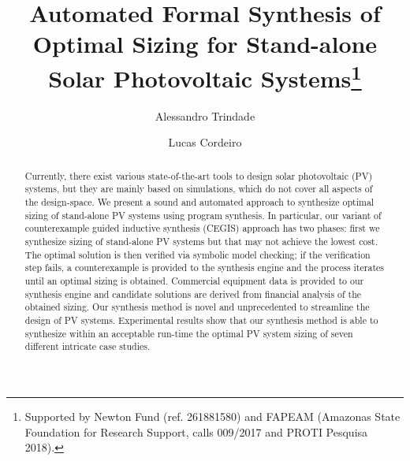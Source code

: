 \documentclass[runningheads]{llncs}
\begin{document}
%
\title{Automated Formal Synthesis of Optimal Sizing for Stand-alone Solar Photovoltaic Systems\thanks{Supported by Newton Fund (ref. 261881580) and FAPEAM
(Amazonas State Foundation for Research Support, calls 009/2017 and PROTI Pesquisa 2018).}}
%
%
\author{Alessandro Trindade \and
Lucas Cordeiro}
%
%
\maketitle              %

\begin{abstract}
Currently, there exist various state-of-the-art tools to design solar photovoltaic (PV) systems, but they are mainly based on simulations, which do not cover all aspects of the design-space. We present a sound and automated approach to synthesize optimal sizing of stand-alone PV systems using program synthesis. In particular, our variant of counterexample guided inductive synthesis (CEGIS) approach has two phases: first we synthesize sizing of stand-alone PV systems but that may not achieve the lowest cost. The optimal solution is then verified via symbolic model checking; if the verification step fails, a counterexample is provided to the synthesis engine and the process iterates until an optimal sizing is obtained. Commercial equipment data is provided to our synthesis engine and candidate solutions are derived from financial analysis of the obtained sizing. Our synthesis method is novel and unprecedented to streamline the design of PV systems. Experimental results show that our synthesis method is able to synthesize within an acceptable run-time the optimal PV system sizing of seven different intricate case studies.

\end{abstract}
%
\end{document}
